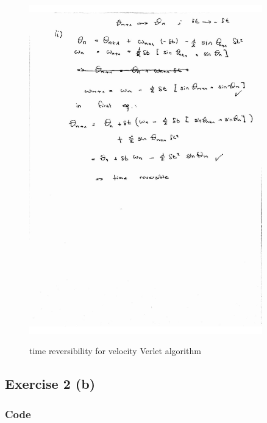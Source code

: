 \documentclass[12pt,a4paper]{article}	%
\begin{document}
\newpage

\begin{figure}[h!]		
\centering
{\includegraphics[width=0.9\textwidth]{3_2_a2.jpg}}		
\caption{time reversibility for velocity Verlet algorithm}
\end{figure}

\newpage
\subsection{Exercise 2 (b)}
\subsubsection{Code}


\end{document}
